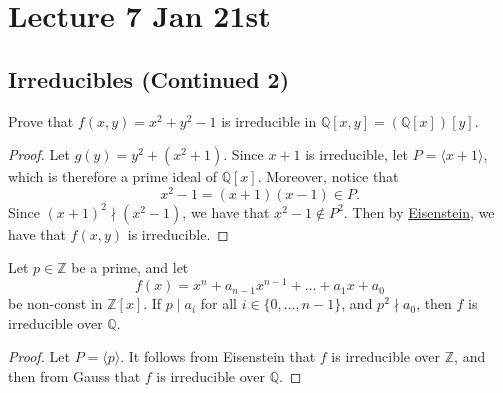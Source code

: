 \documentclass[notoc,notitlepage]{tufte-book}
\begin{document}


\chapter{Lecture 7 Jan 21st}%
\label{chp:lecture_7_jan_21st}

\section{Irreducibles (Continued 2)}%
\label{sec:irreducibles_continued_2}

\begin{eg}
  Prove that $f(x, y) = x^2 + y^2 - 1$ is irreducible in $\mathbb{Q}[x, y] = (\mathbb{Q}[x])[y]$.
\end{eg}

\begin{proof}
  Let $g(y) = y^2 + (x^2 + 1)$. Since $x + 1$ is irreducible, let $P = \langle x + 1 \rangle$,
  which is therefore a prime ideal of $\mathbb{Q}[x]$. Moreover, notice that
  \begin{equation*}
    x^2 - 1 = ( x + 1 )( x - 1 ) \in P.
  \end{equation*}
  Since $(x + 1)^2 \nmid \left(x^2 - 1\right)$, we have that $x^2 - 1 \notin P^2$. Then by
  \hyperref[propo:eisenstein_s_criterion]{Eisenstein}, we have that $f(x, y)$ is irreducible.
\end{proof}

\begin{crly}\label{crly:eisenstein_gauss}
  Let $p \in \mathbb{Z}$ be a prime, and let
  \begin{equation*}
    f(x) = x^n + a_{n - 1} x^{n - 1} + \hdots + a_1 x + a_0
  \end{equation*}
  be non-const in $\mathbb{Z}[x]$. If $p \mid a_i$ for all $i \in \{0, \ldots, n - 1\}$, and
  $p^2 \nmid a_0$, then $f$ is irreducible over $\mathbb{Q}$.
\end{crly}


\begin{proof}
  Let $P = \langle p \rangle$. It follows from Eisenstein that $f$ is irreducible over $\mathbb{Z}$,
  and then from Gauss that $f$ is irreducible over $\mathbb{Q}$.
\end{proof}
\end{document}
